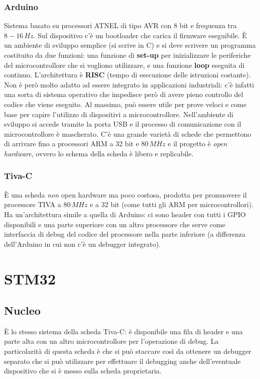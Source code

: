 \documentclass[12pt, a4paper]{report}
\begin{document}
\subsection{Arduino}
Sistema basato su processori ATNEL di tipo AVR con 8 bit e frequenza tra $8 - 16\,Hz$. Sul dispositivo c'è un bootloader che carica il firmware eseguibile. È un ambiente di sviluppo semplice (si scrive in C) e si deve scrivere un programma costituito da due funzioni: una funzione di \textbf{set-up} per inizializzare le periferiche del microcontrollore che si vogliono utilizzare, e una funzione \textbf{loop} eseguita di continuo. L'architettura è \textbf{RISC} (tempo di esecuzione delle istruzioni costante). Non è però molto adatto ad essere integrato in applicazioni industriali: c'è infatti una sorta di sistema operativo che impedisce però di avere pieno controllo del codice che viene eseguito. Al massimo, può essere utile per prove veloci e come base per capire l'utilizzo di dispositivi a microcontrollore. Nell'ambiente di sviluppo si accede tramite la porta USB e il processo di comunicazione con il microcontrollore è mascherato. C'è una grande varietà di schede che permettono di arrivare fino a processori ARM a 32 bit e $80\,MHz$ e il progetto è \textit{open hardware}, ovvero lo schema della scheda è libero e replicabile.

\subsection{Tiva-C}
È una scheda \textit{non} open hardware ma poco costosa, prodotta per promuovere il processore TIVA a $80\,MHz$ e a 32 bit (come tutti gli ARM per microcontrollori). Ha un'architettura simile a quella di Arduino: ci sono header con tutti i GPIO disponibili e una parte superiore con un altro processore che serve come interfaccia di debug del codice del processore nella parte inferiore (a differenza dell'Arduino in cui non c'è un debugger integrato).

\chapter{STM32}

\section{Nucleo}
È lo stesso sistema della scheda Tiva-C: è disponibile una fila di header e una parte alta con un altro microcontrollore per l'operazione di debug. La particolarità di questa scheda è che si può staccare così da ottenere un debugger separato che si può utilizzare per effettuare il debugging anche dell'eventuale dispositivo che si è messo sulla scheda proprietaria.
\end{document}
